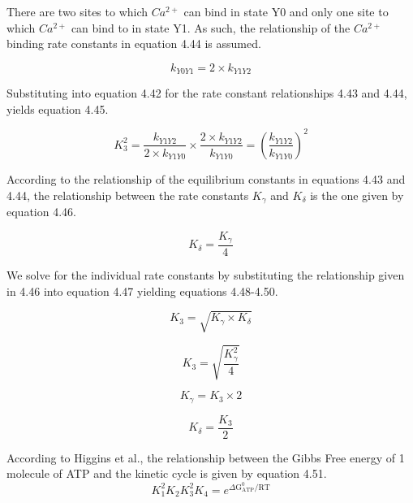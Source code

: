 \documentclass[12pt]{ucsddissertation}
\begin{document}
There are two sites to which $Ca^{2+}$ can bind in state Y0 and only one site to which $Ca^{2+}$ can bind to in state Y1. As such, the relationship of the $Ca^{2+}$ binding rate constants in equation 4.44 is assumed. 


\begin{equation}
k_{Y0Y1}=2 \times k_{Y1Y2} 
\end{equation} 

Substituting into equation 4.42 for the rate constant relationships 4.43 and 4.44, yields equation 4.45.

\begin{equation}
K^{2}_{3}=  \frac{k_{Y1Y2}}{2 \times k_{Y1Y0}} \times \frac{2 \times k_{Y1Y2}}{k_{Y1Y0}} = \left(\frac{k_{Y1Y2}}{k_{Y1Y0}}\right)^{2}
\end{equation}

According to the relationship of the equilibrium constants in equations 4.43 and 4.44, the relationship between the rate constants $K_{\gamma}$ and $K_{\delta}$ is the one given by equation 4.46.

\begin{equation}
K_{\delta}= \frac{K_{\gamma}}{4}
\end{equation}

We solve for the individual rate constants by substituting the relationship given in 4.46 into equation 4.47 yielding equations 4.48-4.50. 


\begin{equation}
K_{3}= \sqrt{K_{\gamma} \times K_{\delta}}
\end{equation}


\begin{equation}
K_{3}= \sqrt{\frac{K_{\gamma}^2}{4}}
\end{equation}

\begin{equation}
K_{\gamma}= K_{3} \times 2
\end{equation}

\begin{equation}
K_{\delta}= \frac{K_{3}}{2} 
\end{equation}

According to Higgins et al., the relationship between the Gibbs Free energy of 1 molecule of ATP and the kinetic cycle is given by equation 4.51.
\begin{equation}
K _ { 1 } ^ { 2 }   K _ { 2 } K _ { 3 } ^ { 2 } K _ { 4 } = e ^ { \Delta \mathrm { G } _ { \mathrm { ATP } } ^ { 0 } / \mathrm { RT } }
\end{equation}
\end{document}

